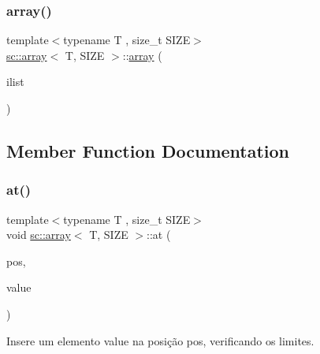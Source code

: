 \mbox{\label{classsc_1_1array_a48f911993c1804c9d7acc8c1cbca6b43}} 
\subsubsection{\texorpdfstring{array()}{array()}\hspace{0.1cm}{\footnotesize\ttfamily [3/3]}}
{\footnotesize\ttfamily template$<$typename T , size\+\_\+t S\+I\+ZE$>$ \\
\hyperlink{classsc_1_1array}{sc\+::array}$<$ T, S\+I\+ZE $>$\+::\hyperlink{classsc_1_1array}{array} (\begin{DoxyParamCaption}\item[{std\+::initializer\+\_\+list$<$ T $>$}]{ilist }\end{DoxyParamCaption})\hspace{0.3cm}{\ttfamily [inline]}}



\subsection{Member Function Documentation}
\mbox{\label{classsc_1_1array_a00b156f242da8caa5c30625b5e678336}} 
\subsubsection{\texorpdfstring{at()}{at()}\hspace{0.1cm}{\footnotesize\ttfamily [1/3]}}
{\footnotesize\ttfamily template$<$typename T , size\+\_\+t S\+I\+ZE$>$ \\
void \hyperlink{classsc_1_1array}{sc\+::array}$<$ T, S\+I\+ZE $>$\+::at (\begin{DoxyParamCaption}\item[{size\+\_\+t}]{pos,  }\item[{const T \&}]{value }\end{DoxyParamCaption})\hspace{0.3cm}{\ttfamily [inline]}}



Insere um elemento \textquotesingle{}value\textquotesingle{} na posição \textquotesingle{}pos\textquotesingle{}, verificando os limites. 


